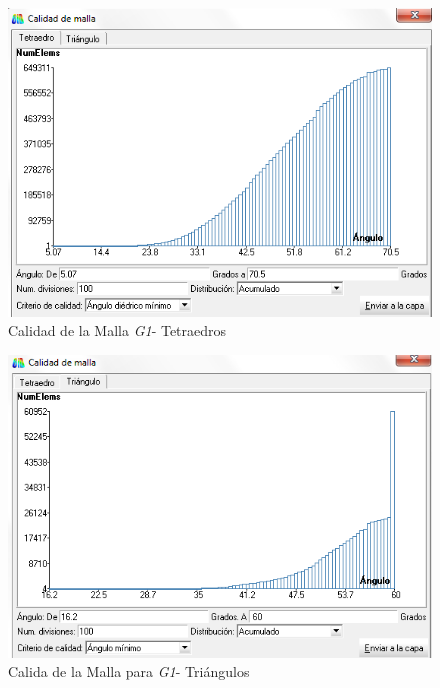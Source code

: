 \documentclass[10pt,a4paper,final]{article}
\begin{document}
%
\begin{figure}[tbhp]
\centerline{\includegraphics[scale=0.60]{img/100m/100_calidad_malla_tetraedros}}
\caption{Calidad de la Malla \emph{G1}- Tetraedros}
\label{100_calidad_malla_tetraedros}
\end{figure}
%
\begin{figure}[tbhp]
\centerline{\includegraphics[scale=0.60]{img/100m/100_calidad_malla_triangulos}}
\caption{Calida de la Malla para \emph{G1}- Triángulos}
\label{100_calidad_malla_triangulos}
\end{figure}
%
\end{document}
